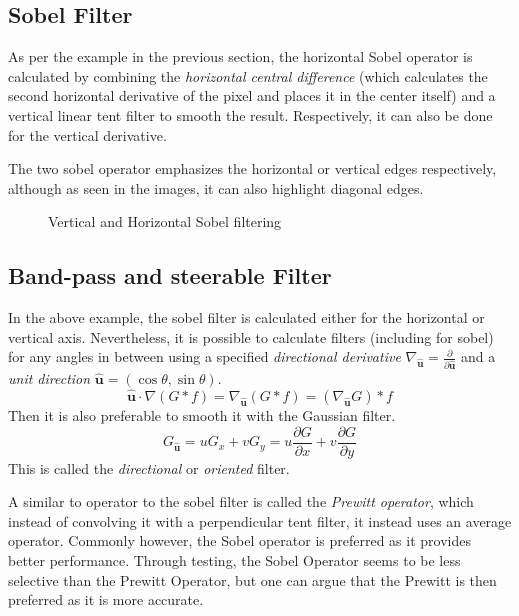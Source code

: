 \documentclass[twoside,a4paper,article]{combine}
\begin{document}
\subsection{Sobel Filter}
As per the example in the previous section, the horizontal Sobel operator is calculated by combining the \emph{horizontal central difference}
(which calculates the second horizontal derivative of the pixel and places it in the center itself) and a vertical linear tent filter to smooth the result. Respectively, it can also
be done for the vertical derivative.

The two sobel operator emphasizes the horizontal or vertical edges respectively, although as seen in the images, it can also highlight diagonal edges.\\
\begin{minipage}{\textwidth}\begin{figure}[H]
    \centering
    \caption{Vertical and Horizontal Sobel filtering\cite{NASA_on_The_Commons_2023}}\label{fig:sobel}
\end{figure}\end{minipage}

\subsection{Band-pass and steerable Filter}
In the above example, the sobel filter is calculated either for the horizontal or
vertical axis. Nevertheless, it is possible to calculate filters (including for sobel) for any angles in between using a specified 
\emph{directional derivative} $\nabla_{\boldsymbol{\hat{u}}} = \frac{\partial}{\partial\boldsymbol{\hat{u}}}$ 
and a \emph{unit direction} $\boldsymbol{\hat{u}} = (\cos \theta, \sin \theta)$\cite{Szeliski_2022}.
\[
    \boldsymbol{\hat{u}} \cdot \nabla (G \ast f) = \nabla_{\boldsymbol{\hat{u}}}(G \ast f) = (\nabla_{\boldsymbol{\hat{u}}}G) \ast  f
\]
Then it is also preferable to smooth it with the Gaussian filter.
\[
    G_{\boldsymbol{\hat{u}}} = u G_x + v G_y = u \frac{\partial G}{\partial x} + v \frac{\partial G}{\partial y} 
\]
This is called the \emph{directional} or \emph{oriented} filter.

A similar to operator to the sobel filter is called the \emph{Prewitt operator}, which instead of convolving it with a perpendicular tent filter,
it instead uses an average operator. Commonly however, the Sobel operator is preferred as it provides better performance\cite{NIXON2020141}. Through testing, the Sobel Operator seems
to be less selective than the Prewitt Operator, but one can argue that the Prewitt is then preferred as it is more accurate.
\end{document}
